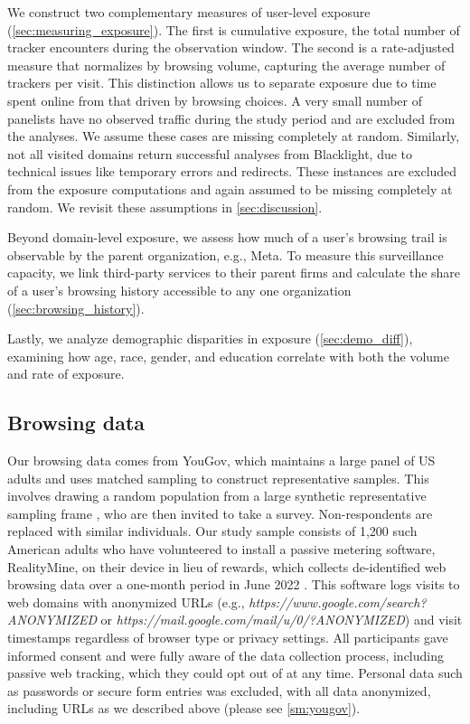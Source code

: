 \documentclass[12pt, letterpaper]{article}
\begin{document}
We construct two complementary measures of user-level exposure (\cref{sec:measuring_exposure}). The first is cumulative exposure, the total number of tracker encounters during the observation window. The second is a rate-adjusted measure that normalizes by browsing volume, capturing the average number of trackers per visit. This distinction allows us to separate exposure due to time spent online from that driven by browsing choices. A very small number of panelists have no observed traffic during the study period and are excluded from the analyses. We assume these cases are missing completely at random. Similarly, not all visited domains return successful analyses from Blacklight, due to technical issues like temporary errors and redirects. These instances are excluded from the exposure computations and again assumed to be missing completely at random. We revisit these assumptions in \cref{sec:discussion}.

Beyond domain-level exposure, we assess how much of a user’s browsing trail is observable by the parent organization, e.g., Meta. To measure this surveillance capacity, we link third-party services to their parent firms and calculate the share of a user’s browsing history accessible to any one organization (\cref{sec:browsing_history}).

Lastly, we analyze demographic disparities in exposure (\cref{sec:demo_diff}), examining how age, race, gender, and education correlate with both the volume and rate of exposure.

\subsection{Browsing data}
Our browsing data comes from YouGov, which maintains a large panel of US adults and uses matched sampling to construct representative samples. This involves drawing a random population from a large synthetic representative sampling frame \citep{rivers2009}, who are then invited to take a survey. Non-respondents are replaced with similar individuals. Our study sample consists of 1,200 such American adults who have volunteered to install a passive metering software, RealityMine, on their device in lieu of rewards, which collects de-identified web browsing data over a one-month period in June 2022 \citep{bad_domains, data-dataverse, ss-adult}. This software logs visits to web domains with anonymized URLs (e.g., \textit{https://www.google.com/search?ANONYMIZED} or \textit{https://mail.google.com/mail/u/0/?ANONYMIZED}) and visit timestamps regardless of browser type or privacy settings. All participants gave informed consent and were fully aware of the data collection process, including passive web tracking, which they could opt out of at any time. Personal data such as passwords or secure form entries was excluded, with all data anonymized, including URLs as we described above (please see \cref{sm:yougov}).
\end{document}
